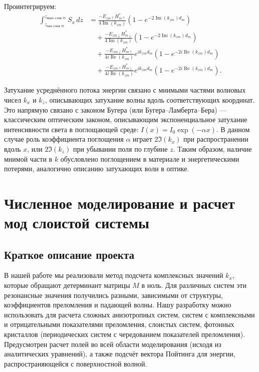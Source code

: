 \documentclass{article}
\begin{document}
Проинтегрируем:
\begin{equation}
\begin{aligned}
\int_{z_{\text{низ слоя } m}}^{z_{\text{верх слоя } m}} S_x \, dz
&= \frac{-E_{zm\uparrow}H_{m\uparrow}^*}{4 \operatorname{Im}(k_{zm})} \left(1 - e^{-2\operatorname{Im}(k_{zm})d_m}\right) \\
&\quad + \frac{-E_{zm\downarrow}H_{m\downarrow}^*}{4 \operatorname{Im}(k_{zm})} \left(1 - e^{-2\operatorname{Im}(k_{zm})d_m}\right) \\
&\quad + \frac{-E_{zm\downarrow}H_{m\uparrow}^*}{4i\operatorname{Re}(k_{zm})} e^{i k_{zm} d_m} \left(1 - e^{-2i\operatorname{Re}(k_{zm})d_m}\right) \\
&\quad + \frac{-E_{zm\uparrow}H_{m\downarrow}^*}{4i \operatorname{Re}(k_{zm})} e^{ik_{zm} d_m} \left(1 - e^{-2i \operatorname{Re}(k_{zm})d_m}\right).
\end{aligned}
\end{equation}


Затухание усреднённого потока энергии связано с мнимыми частями волновых чисел $k_x$ и $k_z$, описывающих затухание волны вдоль соответствующих координат. Это напрямую связано с законом Бугера (или Бугера–Ламберта–Бера) — классическим оптическим законом, описывающим экспоненциальное затухание интенсивности света в поглощающей среде: $I(x) = I_0 \exp(-\alpha x)$. В данном случае роль коэффициента поглощения $\alpha$ играет $2\Im(k_x)$ при распространении вдоль $x$, или $2\Im(k_z)$ при убывании поля по глубине $z$. Таким образом, наличие мнимой части в $k$ обусловлено поглощением в материале и энергетическими потерями, аналогично описанию затухающих волн в оптике.

\clearpage

\section{Численное моделирование и расчет мод слоистой системы}

\subsection{Краткое описание проекта}

В нашей работе мы реализовали метод подсчета комплексных значений $k_x$, которые обращают детерминант матрицы $M$ в ноль. Для различных систем эти резонансные значения получились разными, зависимыми от структуры, коэффициентов преломления и падающей волны. Нашу разработку можно использовать для расчета сложных анизотропных систем, систем с комплексными и отрицательными показателями преломления, слоистых систем, фотонных кристаллов (периодических систем с чередованием показателей преломления). Предусмотрен расчет полей во всей области моделирования (исходя из аналитических уравнений), а также подсчёт вектора Пойтинга для энергии, распространяющейся с поверхностной волной.
\end{document}
